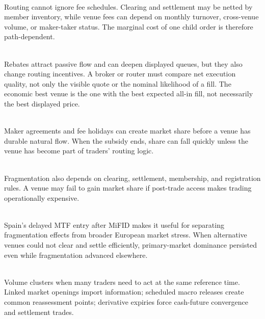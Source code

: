 \begin{caveat} \\
Routing cannot ignore fee schedules. Clearing and settlement may be netted by member inventory, while venue fees can depend on monthly turnover, cross-venue volume, or maker-taker status. The marginal cost of one child order is therefore path-dependent.
\end{caveat}

\begin{mechanism} \\
Rebates attract passive flow and can deepen displayed queues, but they also change routing incentives. A broker or router must compare net execution quality, not only the visible quote or the nominal likelihood of a fill. The economic best venue is the one with the best expected all-in fill, not necessarily the best displayed price.
\end{mechanism}

\begin{caveat} \\
Maker agreements and fee holidays can create market share before a venue has durable natural flow. When the subsidy ends, share can fall quickly unless the venue has become part of traders' routing logic.
\end{caveat}

\begin{caveat} \\
Fragmentation also depends on clearing, settlement, membership, and registration rules. A venue may fail to gain market share if post-trade access makes trading operationally expensive.
\end{caveat}

\begin{casestudy} \\
Spain's delayed MTF entry after MiFID makes it useful for separating fragmentation effects from broader European market stress. When alternative venues could not clear and settle efficiently, primary-market dominance persisted even while fragmentation advanced elsewhere.
\end{casestudy}

\begin{mechanism} \\
Volume clusters when many traders need to act at the same reference time.\\
Linked market openings import information; scheduled macro releases create common reassessment points; derivative expiries force cash-future convergence and settlement trades.
\end{mechanism}

